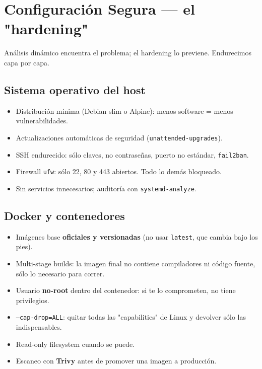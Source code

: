 \documentclass[12pt,a4paper,oneside]{article}
\begin{document}
\section{Configuración Segura --- el "hardening"}

Análisis dinámico encuentra el problema; el hardening lo previene. Endurecimos capa por capa.

\subsection{Sistema operativo del host}

\begin{itemize}[leftmargin=*]
  \item Distribución mínima (Debian slim o Alpine): menos software = menos vulnerabilidades.
  \item Actualizaciones automáticas de seguridad (\texttt{unattended-upgrades}).
  \item SSH endurecido: sólo claves, no contraseñas, puerto no estándar, \texttt{fail2ban}.
  \item Firewall \texttt{ufw}: sólo 22, 80 y 443 abiertos. Todo lo demás bloqueado.
  \item Sin servicios innecesarios; auditoría con \texttt{systemd-analyze}.
\end{itemize}

\subsection{Docker y contenedores}

\begin{itemize}[leftmargin=*]
  \item Imágenes base \textbf{oficiales y versionadas} (no usar \texttt{latest}, que cambia bajo los pies).
  \item Multi-stage builds: la imagen final no contiene compiladores ni código fuente, sólo lo necesario para correr.
  \item Usuario \textbf{no-root} dentro del contenedor: si te lo comprometen, no tiene privilegios.
  \item \texttt{--cap-drop=ALL}: quitar todas las "capabilities" de Linux y devolver sólo las indispensables.
  \item Read-only filesystem cuando se puede.
  \item Escaneo con \textbf{Trivy} antes de promover una imagen a producción.
\end{itemize}
\end{document}
